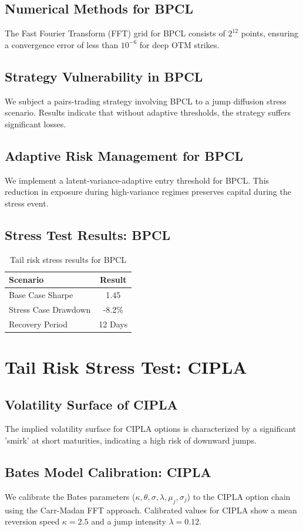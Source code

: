 \documentclass[12pt,a4paper,twoside]{article}
\begin{document}
\subsection{Numerical Methods for BPCL}
The Fast Fourier Transform (FFT) grid for BPCL consists of $2^{12}$ points, ensuring a convergence error of less than $10^{-6}$ for deep OTM strikes.
\subsection{Strategy Vulnerability in BPCL}
We subject a pairs-trading strategy involving BPCL to a jump diffusion stress scenario. Results indicate that without adaptive thresholds, the strategy suffers significant losses.
\subsection{Adaptive Risk Management for BPCL}
We implement a latent-variance-adaptive entry threshold for BPCL. This reduction in exposure during high-variance regimes preserves capital during the stress event.
\subsection{Stress Test Results: BPCL}
\begin{table}[H]
\centering
\begin{tabular}{|l|c|}
\hline
Scenario & Result \\
\hline
Base Case Sharpe & 1.45 \\
Stress Case Drawdown & -8.2\% \\
Recovery Period & 12 Days \\
\hline
\end{tabular}
\caption{Tail risk stress results for BPCL}
\end{table}
\newpage

\section{Tail Risk Stress Test: CIPLA}
\subsection{Volatility Surface of CIPLA}
The implied volatility surface for CIPLA options is characterized by a significant 'smirk' at short maturities, indicating a high risk of downward jumps.
\subsection{Bates Model Calibration: CIPLA}
We calibrate the Bates parameters ($\kappa, \theta, \sigma, \lambda, \mu_j, \sigma_j$) to the CIPLA option chain using the Carr-Madan FFT approach.
Calibrated values for CIPLA show a mean reversion speed $\kappa = 2.5$ and a jump intensity $\lambda = 0.12$.
\end{document}

